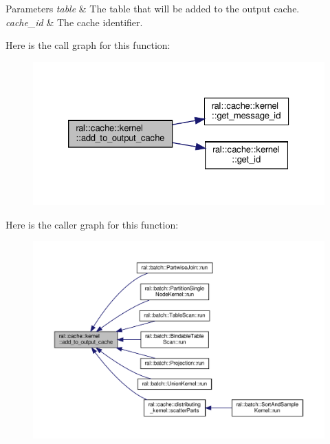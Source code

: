 \begin{DoxyParams}{Parameters}
{\em table} & The table that will be added to the output cache. \\
\hline
{\em cache\+\_\+id} & The cache identifier. \\
\hline
\end{DoxyParams}
Here is the call graph for this function\+:\nopagebreak
\begin{figure}[H]
\begin{center}
\leavevmode
\includegraphics[width=326pt]{classral_1_1cache_1_1kernel_af6b7b538f6a692393f314a4f1037d4a6_cgraph}
\end{center}
\end{figure}
Here is the caller graph for this function\+:\nopagebreak
\begin{figure}[H]
\begin{center}
\leavevmode
\includegraphics[width=350pt]{classral_1_1cache_1_1kernel_af6b7b538f6a692393f314a4f1037d4a6_icgraph}
\end{center}
\end{figure}
\mbox{\label{classral_1_1cache_1_1kernel_ad8cd102392bbece14178c0ebf9f0c6bc}} 
